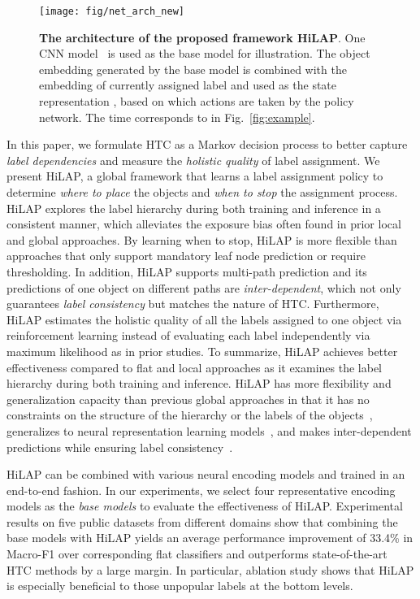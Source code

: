 \documentclass[11pt,a4paper]{article}
\begin{document}
\begin{figure*}[ht]
    \centering
    \texttt{[image: fig/net\_arch\_new]}
     \caption{\textbf{The architecture of the proposed framework HiLAP}. One CNN model~\citep{kim2014convolutional} is used as the base model for illustration. The object embedding  generated by the base model is combined with the embedding of currently assigned label  and used as the state representation , based on which actions are taken by the policy network. The time corresponds to  in Fig.~\ref{fig:example}.}
    \label{fig:net_arch}
    \vspace*{-.1cm}
\end{figure*}



In this paper, we formulate HTC as a Markov decision process to better capture \textit{label dependencies} and measure the \textit{holistic quality} of label assignment.
We present HiLAP, a global framework that learns a label assignment policy to determine \textit{where to place} the objects and \textit{when to stop} the assignment process.
HiLAP explores the label hierarchy during both training and inference in a consistent manner, which alleviates the exposure bias often found in prior local and global approaches.
By learning when to stop, HiLAP is more flexible than approaches that only support mandatory leaf node prediction or require thresholding.
In addition, HiLAP supports multi-path prediction and its predictions of one object on different paths are \textit{inter-dependent}, which not only guarantees \textit{label consistency} but matches the nature of HTC.
Furthermore, HiLAP estimates the holistic quality of all the labels assigned to one object via reinforcement learning instead of evaluating each label independently via maximum likelihood as in prior studies.
To summarize, HiLAP achieves better effectiveness compared to flat and local approaches as it examines the label hierarchy during both training and inference.
HiLAP has more flexibility and generalization capacity than previous global approaches in that it has no constraints on the structure of the hierarchy or the labels of the objects~\citep{cai2004hierarchical}, generalizes to neural representation learning models~\citep{gopal2013recursive}, and makes inter-dependent predictions while ensuring label consistency~\citep{wehrmann2018hierarchical,peng2018large}.


HiLAP can be combined with various neural encoding models and trained in an end-to-end fashion.
In our experiments, we select four representative encoding models as the \textit{base models} to evaluate the effectiveness of HiLAP.
Experimental results on five public datasets from different domains show that combining the base models with HiLAP yields an average performance improvement of 33.4\% in Macro-F1 over corresponding flat classifiers and outperforms state-of-the-art HTC methods by a large margin.
In particular, ablation study shows that HiLAP is especially beneficial to those unpopular labels at the bottom levels.
\end{document}
